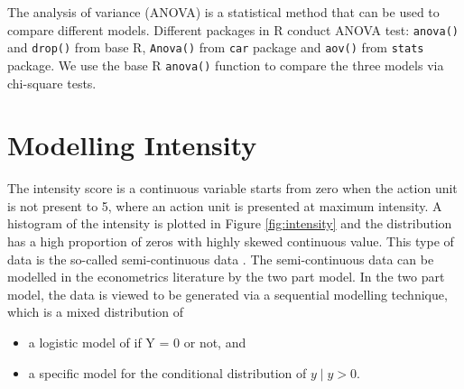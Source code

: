 \documentclass{monashthesis}
\begin{document}
The analysis of variance (ANOVA) \autocites{faraway2016extending}{gelman2006data} is a statistical method that can be used to compare different models. Different packages in R conduct ANOVA test: \texttt{anova()} and \texttt{drop()} from base R, \texttt{Anova()} from \texttt{car} package and \texttt{aov()} from \texttt{stats} package. We use the base R \texttt{anova()} function to compare the three models via chi-square tests.

\newpage

\hypertarget{modelling-intensity}{%
\section{Modelling Intensity}\label{modelling-intensity}}

The intensity score is a continuous variable starts from zero when the action unit is not present to 5, where an action unit is presented at maximum intensity. A histogram of the intensity is plotted in Figure \ref{fig:intensity} and the distribution has a high proportion of zeros with highly skewed continuous value. This type of data is the so-called semi-continuous data \autocites{Neelon2019}{twopart2010}. The semi-continuous data can be modelled in the econometrics literature by the two part model\autocites{cragg1971some}{manning1981two}. In the two part model, the data is viewed to be generated via a sequential modelling technique, which is a mixed distribution of

\begin{itemize}
\tightlist
\item
  a logistic model of if Y = 0 or not, and
\item
  a specific model for the conditional distribution of \(y \mid y > 0\).
\end{itemize}
\end{document}
